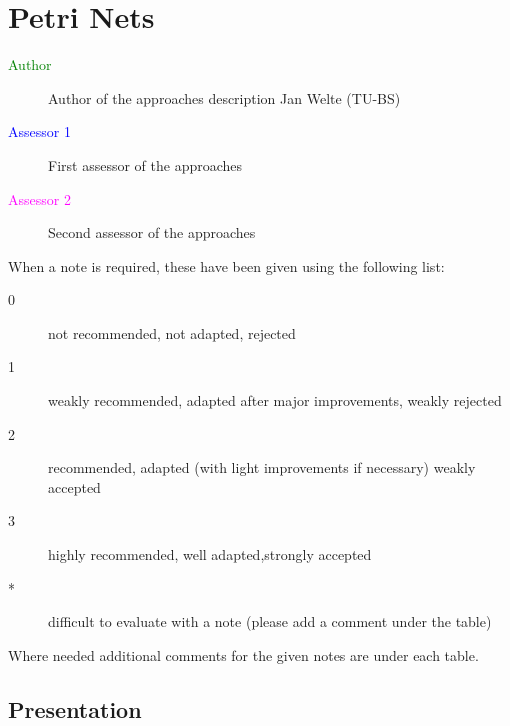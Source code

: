 \chapter{Petri Nets}

\begin{description}
\item[\textcolor{green}{Author}] Author of the approaches description  Jan Welte (TU-BS)
\item[\textcolor{blue}{Assessor 1}] First assessor of the approaches 
\item[\textcolor{magenta}{Assessor 2}] Second assessor of the approaches 
\end{description}

\begin{comment}

\begin{author_comment}
Author can add comments using this format at any place.
\end{author_comment}

\begin{assessor1}
First assessor can add comments using this format at any place.
\end{assessor1}

\begin{assessor2}
Second assessor can add comments using this format at any place.
\end{assessor2}

\end{comment}

When a note is required, these have been given using the following list:
\begin{description}
\item[0] not recommended, not adapted, rejected
\item[1] weakly recommended, adapted after major improvements, weakly rejected
\item[2] recommended, adapted (with light improvements if necessary)  weakly accepted
\item[3] highly recommended, well adapted,strongly accepted
\item[*] difficult to evaluate with a note (please add a comment under the table)
\end{description}

Where needed additional comments for the given notes are under each table.

\section{Presentation}


